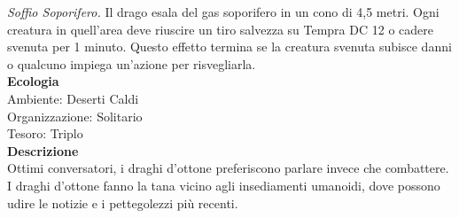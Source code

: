 \begin{multicols}{2}
\emph{Soffio Soporifero.} Il drago esala del gas soporifero in un cono di 4,5 metri. Ogni creatura in quell'area deve riuscire un tiro salvezza su Tempra DC  12 o cadere svenuta per 1 minuto. Questo effetto termina se la creatura svenuta subisce danni o qualcuno impiega un'azione per risvegliarla.\\
\textbf{Ecologia}\\
Ambiente: Deserti Caldi\\
Organizzazione: Solitario\\
Tesoro: Triplo\\
\textbf{Descrizione}\\
Ottimi conversatori, i draghi d’ottone preferiscono parlare invece che combattere. I draghi d’ottone fanno la tana vicino agli insediamenti umanoidi, dove possono udire le notizie e i pettegolezzi più recenti.\\



\end{multicols}
